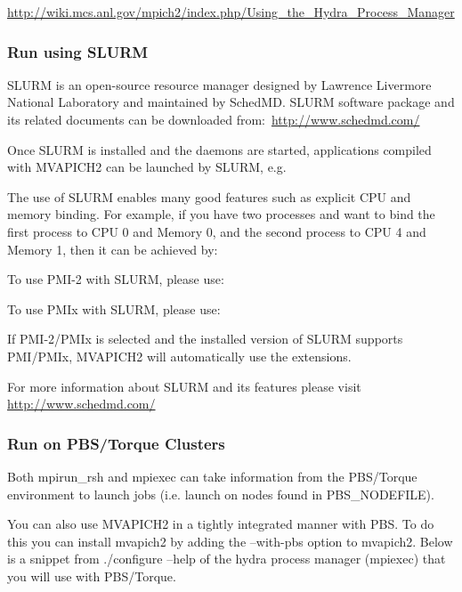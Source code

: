 \href{http://wiki.mcs.anl.gov/mpich2/index.php/Using\_the\_Hydra\_Process\_Manager}
{http://wiki.mcs.anl.gov/mpich2/index.php/Using\_the\_Hydra\_Process\_Manager}


\subsubsection{Run using SLURM}
\label{sec:run-slurm}

SLURM is an open-source resource manager designed by Lawrence Livermore National
Laboratory and maintained by SchedMD. SLURM software package and its related
documents can be downloaded
from:~\href{http://www.schedmd.com/}{http://www.schedmd.com/}

Once SLURM is installed and the daemons are started, applications compiled
with MVAPICH2 can be launched by SLURM, e.g.


The use of SLURM enables many good features such as explicit CPU and memory
binding. For example, if you have two processes and want to bind the first
process to CPU 0 and Memory 0, and the second process to CPU 4 and Memory 1,
then it can be achieved by:


To use PMI-2 with SLURM, please use:


To use PMIx with SLURM, please use:


If PMI-2/PMIx is selected and the installed version of SLURM supports PMI/PMIx,
MVAPICH2 will automatically use the extensions.

For more information about SLURM and its features please visit
\href{http://www.schedmd.com/}{http://www.schedmd.com/}

\subsubsection{Run on PBS/Torque Clusters}
\label{sec:run-pbs}
Both mpirun\_rsh and mpiexec can take information from the PBS/Torque
environment to launch jobs (i.e. launch on nodes found in PBS\_NODEFILE).

You can also use MVAPICH2 in a tightly integrated manner with PBS.  To do this
you can install mvapich2 by adding the --with-pbs option to mvapich2. Below is
a snippet from ./configure --help of the hydra process manager (mpiexec) that
you will use with PBS/Torque.

